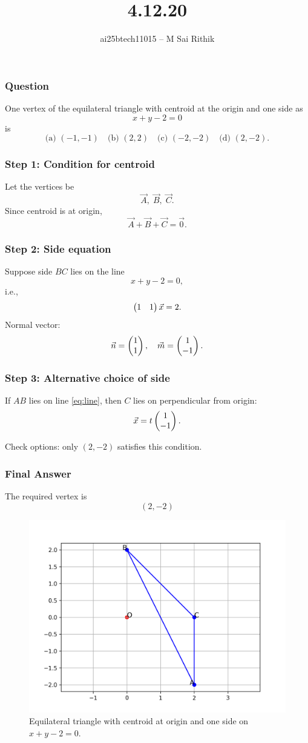 \documentclass{beamer}
\title{4.12.20}
\author{ai25btech11015 -- M Sai Rithik}
\date{}
\begin{document}
\frame{\titlepage}

\begin{frame}
\frametitle{Question}
One vertex of the equilateral triangle with centroid at the origin and one side as
\[
x + y - 2 = 0
\]
is
\[
\text{(a) }(-1,-1) \quad 
\text{(b) }(2,2) \quad 
\text{(c) }(-2,-2) \quad 
\text{(d) }(2,-2).
\]
\end{frame}

\begin{frame}
\frametitle{Step 1: Condition for centroid}
Let the vertices be
\[
\Vec{A},\; \Vec{B},\; \Vec{C}.
\]
Since centroid is at origin,
\begin{equation}
\Vec{A} + \Vec{B} + \Vec{C} = \Vec{0}.
\label{eq:centroid}
\end{equation}
\end{frame}

\begin{frame}
\frametitle{Step 2: Side equation}
Suppose side \(BC\) lies on the line
\begin{equation}
x + y - 2 = 0,
\label{eq:line}
\end{equation}
i.e.,
\[
\begin{pmatrix}1 & 1\end{pmatrix}\Vec{x} = 2.
\]
Normal vector:
\[
\Vec{n} = \begin{pmatrix}1 \\ 1\end{pmatrix}, \quad
\Vec{m} = \begin{pmatrix}1 \\ -1\end{pmatrix}.
\]
\end{frame}

\begin{frame}
\frametitle{Step 3: Alternative choice of side}
If \(AB\) lies on line \eqref{eq:line}, then \(C\) lies on perpendicular from origin:  
\[
\Vec{x} = t\begin{pmatrix}1 \\ -1\end{pmatrix}.
\]

Check options: only \((2,-2)\) satisfies this condition.  
\end{frame}

\begin{frame}
\frametitle{Final Answer}
The required vertex is
\[
\boxed{(2,-2)}
\]

\begin{figure}[h!]
    \centering
    \includegraphics[width=0.6\linewidth]{figs/fig.png}
    \caption{Equilateral triangle with centroid at origin and one side on $x+y-2=0$.}
\end{figure}
\end{frame}
\end{document}
